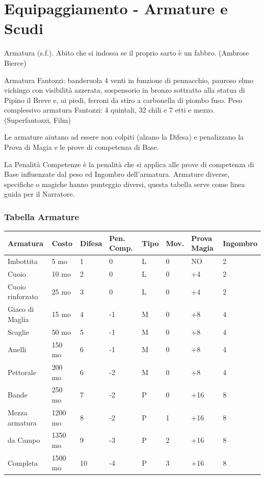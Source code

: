 \section{Equipaggiamento - Armature e Scudi} \hypertarget{equipaggiamento.armature.scudi}{}\label{equipaggiamentoarmature}

\label{equipaggiamento---armature-e-scudi}

\begin{changemargin}{0.3cm}{0.3cm}\begin{enfasi}{
Armatura (s.f.). Abito che si indossa se il proprio sarto è un fabbro. (Ambrose Bierce)

\medskip

Armatura Fantozzi: banderuola 4 venti in funzione di pennacchio, pauroso elmo vichingo con visibilità azzerata, sospensorio in bronzo sottratto alla statua di Pipino il Breve e, ai piedi, ferroni da stiro a carbonella di piombo fuso. Peso complessivo armatura Fantozzi: 4 quintali, 32 chili e 7 etti e mezzo. (Superfantozzi, Film)} \end{enfasi}\end{changemargin}\medskip

Le armature aiutano ad essere non colpiti (alzano la Difesa) e penalizzano la Prova di Magia e le prove di competenza di Base.

La Penalità Competenze è la penalità che si applica alle prove di competenza di Base influenzate dal peso ed Ingombro dell'armatura. Armature diverse, specifiche o magiche hanno punteggio diversi, questa tabella serve come linea guida per il Narratore.

\subsubsection{Tabella Armature}

\label{tabella-armature}
\noindent\begin{tabular}{llllllll}
\textbf{Armatura} & \textbf{Costo} & \textbf{Difesa} & \textbf{Pen. Comp.} & \textbf{Tipo} & \textbf{Mov.} & \textbf{Prova Magia}&\textbf{Ingombro}\\
\toprule
Imbottita & 5 mo & 1 & 0 & L 	& 		0 		& NO		&2\\
Cuoio & 10 mo & 2 & 0 & L 		& 		0 		& +4		&2\\
Cuoio rinforzato& 25 mo& 3 & 0& L 	& 0 		& +4		&2\\
Giaco di Maglia & 15 mo & 4 & -1 & M & 0 		&+8			&4\\
Scaglie& 50 mo & 5& -1& M & 0 					&+8			&4\\
Anelli & 150 mo & 6& -1& M & 0 					&+8			&4\\
Pettorale& 200 mo & 6& -2& M & 0 				&+8			&4\\
Bande & 250 mo & 7& -2& P & 0 					&+16		&8\\
Mezza armatura& 1200 mo& 8& -2& P & 1 			&+16		&8\\
da Campo& 1350 mo& 9& -3& P & 2 				&+16		&8\\
Completa& 1500 mo& 10 & -4& P & 3 				&+16		&8
\end{tabular}

